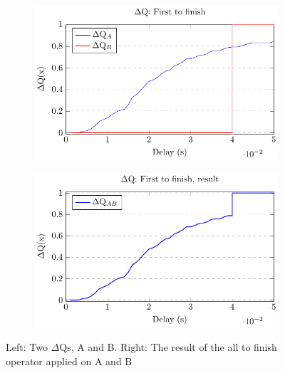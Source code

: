        \begin{figure}[H]
            \centering
            \begin{subfigure}{.5\textwidth}
                \centering
                \includegraphics[scale = 0.7]{tikz/ftf_1.pdf}
                \label{fig:sub1}
            \end{subfigure}%
            \begin{subfigure}{.5\textwidth}
                \centering
                \includegraphics[scale = 0.7]{tikz/ftf_2.pdf}
                \label{fig:sub2}
            \end{subfigure}
            \caption{Left: Two $\Delta$Qs, A and B. Right: The result of the all to finish operator applied on A and B}%
            \label{fig:test}
            \end{figure}


